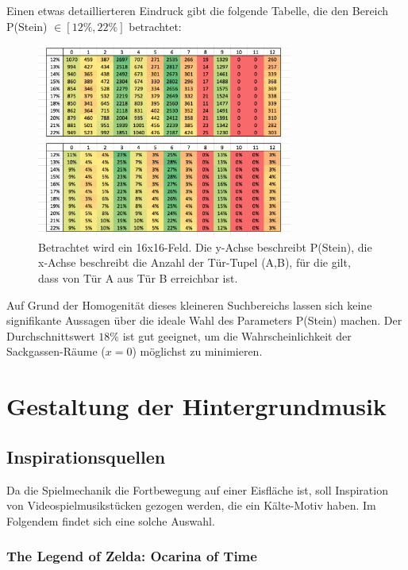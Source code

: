 \documentclass[a4paper,10pt,ngerman]{scrartcl}
\begin{document}
		\newpage


			Einen etwas detaillierteren Eindruck gibt die folgende Tabelle, die den Bereich  P(Stein) \( \in [12\%, 22\% ] \) betrachtet:
			
			\begin{figure}[h!]
				\begin{center}
					\includegraphics[width=0.75\textwidth]{pStein2.png}
					\caption{Betrachtet wird ein 16x16-Feld. Die y-Achse beschreibt P(Stein), die x-Achse beschreibt die Anzahl der Tür-Tupel (A,B), für die gilt, dass von Tür A aus Tür B erreichbar ist.}
				\end{center}
			\end{figure}
		
			Auf Grund der Homogenität dieses kleineren Suchbereichs lassen sich keine signifikante Aussagen über die ideale Wahl des Parameters P(Stein) machen. Der Durchschnittswert \( 18 \% \) ist gut geeignet, um die Wahrscheinlichkeit der Sackgassen-Räume (\( x  = 0 \)) möglichst zu minimieren.


	\newpage
	\section{Gestaltung der Hintergrundmusik}
	
		\subsection{Inspirationsquellen}
		
			Da die Spielmechanik die Fortbewegung auf einer Eisfläche ist, soll Inspiration von Videospielmusikstücken gezogen werden, die ein Kälte-Motiv haben. Im Folgendem findet sich eine solche Auswahl.
			
			\subsubsection{The Legend of Zelda: Ocarina of Time}
			
\end{document}
